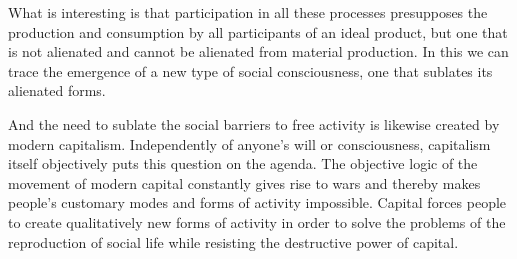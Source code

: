 \documentclass[../main]{subfiles}
\begin{document}
What is interesting is that participation in all these processes presupposes the production and consumption by all participants of an ideal product, but one that is not alienated and cannot be alienated from material production. In this we can trace the emergence of a new type of social consciousness, one that sublates its alienated forms.

And the need to sublate the social barriers to free activity is likewise created by modern capitalism. Independently of anyone’s will or consciousness, capitalism itself objectively puts this question on the agenda. The objective logic of the movement of modern capital constantly gives rise to wars and thereby makes people’s customary modes and forms of activity impossible. Capital forces people to create qualitatively new forms of activity in order to solve the problems of the reproduction of social life while resisting the destructive power of capital.
\end{document}
